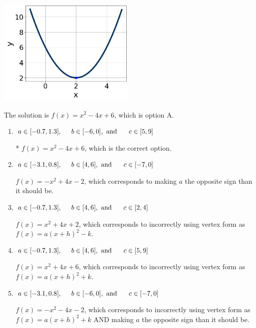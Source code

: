 \documentclass{extbook}[14pt]
\begin{document}
\begin{enumerate}
{\begin{center}
    \includegraphics[width=0.5\textwidth]{../Figures/quadraticGraphToEquationCopyB.png}
\end{center}



The solution is \( f(x) = x^{2} -4 x + 6 \), which is option A.\begin{enumerate}[label=\Alph*.]
\item \( a \in [-0.7, 1.3], \hspace*{5mm} b \in [-6, 0], \text{ and } \hspace*{5mm} c \in [5, 9] \)

* $f(x)=x^{2} -4 x + 6$, which is the correct option.
\item \( a \in [-3.1, 0.8], \hspace*{5mm} b \in [4, 6], \text{ and } \hspace*{5mm} c \in [-7, 0] \)

$f(x)=-x^{2} +4 x -2$, which corresponds to making $a$ the opposite sign than it should be.
\item \( a \in [-0.7, 1.3], \hspace*{5mm} b \in [4, 6], \text{ and } \hspace*{5mm} c \in [2, 4] \)

$f(x)=x^{2} +4 x + 2$, which corresponds to incorrectly using vertex form as $f(x) = a(x+h)^2 - k$.
\item \( a \in [-0.7, 1.3], \hspace*{5mm} b \in [4, 6], \text{ and } \hspace*{5mm} c \in [5, 9] \)

$f(x)=x^{2} +4 x + 6$, which corresponds to incorrectly using vertex form as $f(x) = a(x+h)^2+k$.
\item \( a \in [-3.1, 0.8], \hspace*{5mm} b \in [-6, 0], \text{ and } \hspace*{5mm} c \in [-7, 0] \)

$f(x)=-x^{2} -4 x -2$, which corresponds to incorrectly using vertex form as $f(x) = a(x+h)^2+k$ AND making $a$ the opposite sign than it should be.
\end{enumerate}

}
\end{enumerate}
\end{document}
